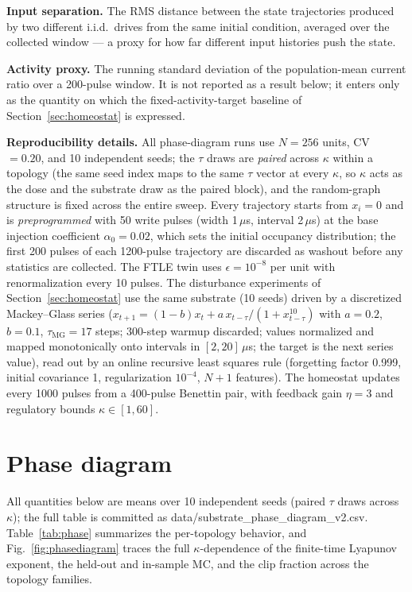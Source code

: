 \documentclass[11pt]{article}
\begin{document}
\textbf{Input separation.} The RMS distance between the state trajectories
produced by two different i.i.d.\ drives from the same initial condition,
averaged over the collected window --- a proxy for how far different input
histories push the state.

\textbf{Activity proxy.} The running standard deviation of the population-mean
current ratio over a 200-pulse window. It is not reported as a result below;
it enters only as the quantity on which the fixed-activity-target baseline of
Section~\ref{sec:homeostat} is expressed.

\textbf{Reproducibility details.} All phase-diagram runs use $N=256$ units,
CV $=0.20$, and 10 independent seeds; the $\tau$ draws are \emph{paired}
across $\kappa$ within a topology (the same seed index maps to the same
$\tau$ vector at every $\kappa$, so $\kappa$ acts as the dose and the
substrate draw as the paired block), and the random-graph structure is fixed
across the entire sweep. Every trajectory starts from $x_i=0$ and is
\emph{preprogrammed} with 50 write pulses (width 1\,$\mu$s, interval
2\,$\mu$s) at the base injection coefficient $\alpha_0=0.02$, which sets the
initial occupancy distribution; the first 200 pulses of each 1200-pulse
trajectory are discarded as washout before any statistics are collected. The
FTLE twin uses $\epsilon=10^{-8}$ per unit with renormalization every 10
pulses. The disturbance experiments of Section~\ref{sec:homeostat} use the
same substrate (10 seeds) driven by a discretized Mackey--Glass series
($x_{t+1}=(1-b)x_t + a\,x_{t-\tau}/(1+x_{t-\tau}^{10})$ with $a=0.2$,
$b=0.1$, $\tau_{\mathrm{MG}}=17$ steps; 300-step warmup discarded; values
normalized and mapped monotonically onto intervals in $[2,20]\,\mu$s; the
target is the next series value), read out by an online recursive least
squares rule (forgetting factor 0.999, initial covariance 1, regularization
$10^{-4}$, $N+1$ features). The homeostat updates every 1000 pulses from a
400-pulse Benettin pair, with feedback gain $\eta=3$ and regulatory bounds
$\kappa\in[1,60]$.

\section{Phase diagram}
\label{sec:phasediagram}

All quantities below are means over 10 independent seeds (paired $\tau$ draws
across $\kappa$); the full table is committed as
data/substrate\_phase\_diagram\_v2.csv. Table~\ref{tab:phase} summarizes the
per-topology behavior, and Fig.~\ref{fig:phasediagram} traces the full
$\kappa$-dependence of the finite-time Lyapunov exponent, the held-out and
in-sample MC, and the clip fraction across the topology families.
\end{document}
